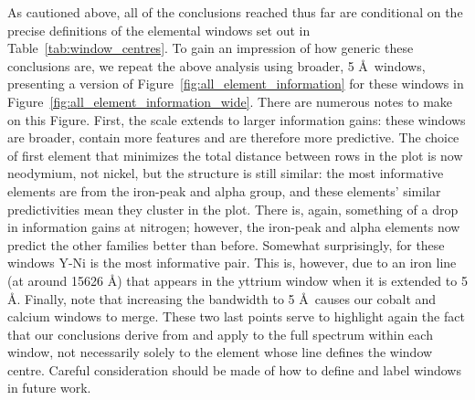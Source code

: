 \documentclass[a4paper,fleqn,usenatbib]{mnras}
\begin{document}
As cautioned above, all of the conclusions reached thus far are conditional on the precise definitions of the elemental windows set out in Table~\ref{tab:window_centres}. To gain an impression of how generic these conclusions are, we repeat the above analysis using broader, 5 \AA\ windows, presenting a version of Figure~\ref{fig:all_element_information} for these windows in Figure~\ref{fig:all_element_information_wide}. There are numerous notes to make on this Figure. First, the scale extends to larger information gains: these windows are broader, contain more features and are therefore more predictive. The choice of first element that minimizes the total distance between rows in the plot is now neodymium, not nickel, but the structure is still similar: the most informative elements are from the iron-peak and alpha group, and these elements' similar predictivities mean they cluster in the plot. There is, again, something of a drop in information gains at nitrogen; however, the iron-peak and alpha elements now predict the other families better than before. Somewhat surprisingly, for these windows Y-Ni is the most informative pair. This is, however, due to an iron line (at around 15626 \AA) that appears in the yttrium window when it is extended to 5 \AA. Finally, note that increasing the bandwidth to 5 \AA\ causes our cobalt and calcium windows to merge. These two last points serve to highlight again the fact that our conclusions derive from and apply to the full spectrum within each window, not necessarily solely to the element whose line defines the window centre. Careful consideration should be made of how to define and label windows in future work.
\end{document}
